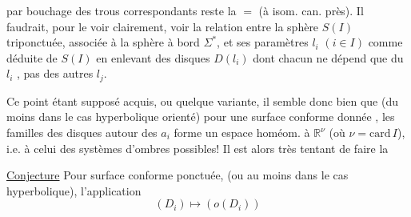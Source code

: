
par bouchage des trous correspondants reste la $=$ (à isom. can. près). Il faudrait, pour le voir clairement, voir la relation entre la sphère  $S(I)$ triponctuée, associée à la sphère à bord $\Sigma^*$, et ses paramètres $l_i$ $(i\in I)$ comme déduite  de $S(I)$ en enlevant des disques   $D(l_i)$  dont chacun ne dépend que du $l_i$ , pas des autres $l_j$.

Ce point étant supposé acquis, ou quelque variante, il semble donc bien que (du moins dans le cas hyperbolique orienté) pour une surface conforme  donnée , les familles  des disques autour des $a_i$ forme un espace homéom. à $\mathbb R^\nu$ (où $\nu=\mathrm{card}\,I$), i.e. à celui des systèmes d'ombres possibles! Il est alors très tentant de faire la

\uline{Conjecture} Pour  surface conforme ponctuée, (ou  au moins dans le cas hyperbolique), l'application 
\[
(D_i)\longmapsto (o(D_i))
\]
